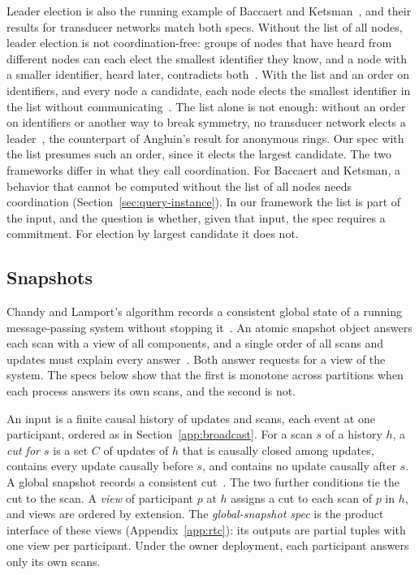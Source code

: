 \documentclass[sigconf]{cidr-2027}
\theoremstyle{remark}
\newcommand{\commitment}{commitment\xspace}
\begin{document}
Leader election is also the running example of Baccaert and
Ketsman~\cite{baccaert2026spectrum}, and their results for transducer networks
match both specs. Without the list of all nodes, leader election is not
coordination-free: groups of nodes that have heard from different nodes can
each elect the smallest identifier they know, and a node with a smaller
identifier, heard later, contradicts both~\cite[Prop.~37]{baccaert2026spectrum}. With the list and an order on identifiers, and every node a candidate, each
node elects the smallest identifier in the list without
communicating~\cite[Ex.~6]{baccaert2026spectrum}. The list alone is not
enough: without an order on identifiers or another way to break symmetry, no
transducer network elects a leader~\cite[Thm.~1]{baccaert2026spectrum}, the
counterpart of Angluin's result for anonymous rings. Our spec with the list
presumes such an order, since it elects the largest candidate. The two
frameworks differ in what they call coordination. For Baccaert and Ketsman, a
behavior that cannot be computed without the list of all nodes needs
coordination (Section~\ref{sec:query-instance}). In our framework the list is
part of the input, and the question is whether, given that input, the spec
requires a \commitment. For election by largest candidate it does not.

\subsection{Snapshots}
\label{app:snapshots}

Chandy and Lamport's algorithm records a consistent global state of a running
message-passing system without stopping it~\cite{chandy1985distributed}. An
atomic snapshot object answers each scan with a view of all components, and a
single order of all scans and updates must explain every
answer~\cite{afek1993atomic}. Both answer requests for a view of the system. The specs below show that the first is monotone across partitions when each
process answers its own scans, and the second is not.

An input is a finite causal history of updates and scans, each event at one
participant, ordered as in Section~\ref{app:broadcast}. For a scan $s$ of a
history $h$, a \emph{cut for $s$} is a set $C$ of updates of $h$ that is
causally closed among updates, contains every update causally before $s$, and
contains no update causally after $s$. A global snapshot records a
consistent cut~\cite{chandy1985distributed}. The two further conditions tie
the cut to the scan. A \emph{view} of participant $p$ at $h$ assigns a cut to
each scan of $p$ in $h$, and views are ordered by extension. The
\emph{global-snapshot spec} is the product interface of these views
(Appendix~\ref{app:rtc}): its outputs are partial tuples with one view per
participant. Under the owner deployment, each participant answers only its
own scans.
\end{document}
